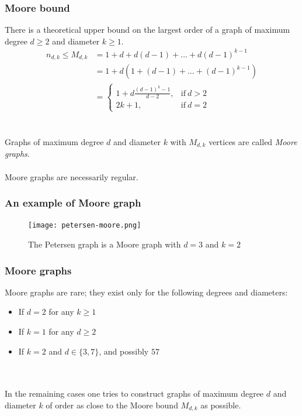 \documentclass{beamer}
\begin{document}
\begin{frame}
	\frametitle{Moore bound}
	There is a theoretical upper bound on the largest order of a graph of maximum degree $d\ge 2$ and diameter $k\ge 1$.
	\begin{equation}\label{eq:Moore}
		\begin{split}
			n_{d,k} \leq M_{d,k}    & = 1 + d + d(d - 1) + \dots + d(d - 1)^{k-1}  \\
									& = 1 + d(1 + (d - 1) + \dots + (d - 1)^{k-1}) \\
									& = \begin{cases}
											1+d\frac{(d-1)^{k}-1}{d-2}, & \text{if}\ d > 2 \\
											2k+1, & \text{if}\ d=2
										\end{cases}
		\end{split}
	\end{equation} ~\\~\\
	Graphs of maximum degree $d$ and diameter $k$ with $M_{d,k}$ vertices are called {\em Moore graphs}. \\~\\
	Moore graphs are necessarily regular.
\end{frame}
\begin{frame}
	\frametitle{An example of Moore graph}
		\begin{figure}[!ht]
    		\centering
    		\texttt{[image: petersen-moore.png]}
    		\caption{The Petersen graph is a Moore graph with $d=3$ and $k=2$ }
		\end{figure}
\end{frame}
\begin{frame}
	\frametitle{Moore graphs}
	Moore graphs are rare; they exist only for the following degrees and diameters: ~\\
	\begin{itemize}
		\item If $d = 2$ for any $k \geq 1$
		\item If $k = 1$ for any $d \geq 2$
		\item If $k = 2$ and $d \in \{3, 7 \}$, and possibly $57$
	\end{itemize} ~\\~\\
	In the remaining cases one tries to construct graphs of maximum degree $d$ and diameter $k$ of order as close to the Moore bound $M_{d,k}$ as possible.
\end{frame}
\end{document}
